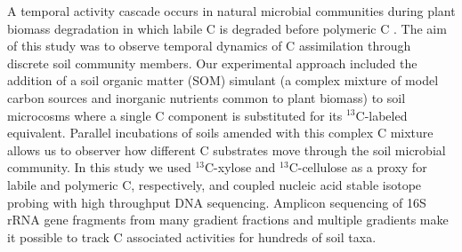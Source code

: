 A temporal activity cascade occurs in natural microbial communities during
plant biomass degradation in which labile C is degraded before polymeric
C \citep{Hu_1997,Rui_2009}.  The aim of this study was to observe temporal
dynamics of C assimilation through discrete soil community members. Our
experimental approach included the addition of a soil organic matter (SOM)
simulant (a complex mixture of model carbon sources and inorganic nutrients
common to plant biomass) to soil microcosms where a single C component is
substituted for its $^{13}$C-labeled equivalent. Parallel incubations of soils
amended with this complex C mixture allows us to observer how different
C substrates move through the soil microbial community. In this study we used
$^{13}$C-xylose and $^{13}$C-cellulose as a proxy for labile and polymeric C,
respectively, and coupled nucleic acid stable isotope probing with high
throughput DNA sequencing. Amplicon sequencing of 16S rRNA
gene fragments from many gradient fractions and multiple gradients make it
possible to track C associated activities for hundreds of soil taxa.
